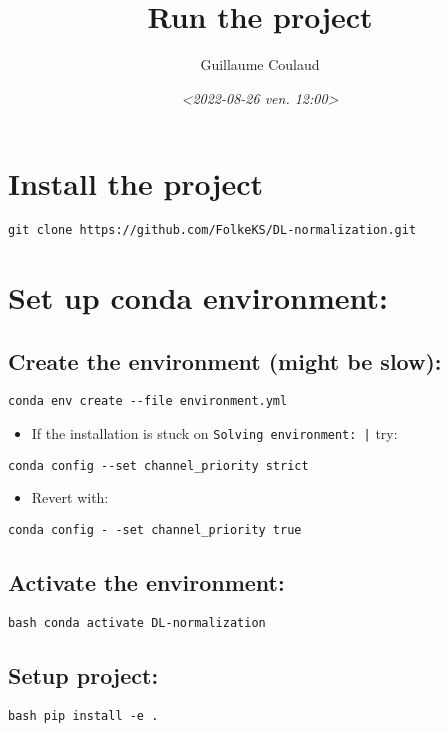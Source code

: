 \documentclass[11pt]{article}
\author{Guillaume Coulaud}
\date{\textit{<2022-08-26 ven. 12:00>}}
\title{Run the project}
\begin{document}
\maketitle
\tableofcontents

\section{Install the project}
\label{sec:orge89ff4f}
\begin{verbatim}
git clone https://github.com/FolkeKS/DL-normalization.git
\end{verbatim}

\section{Set up conda environment:}
\label{sec:org866e4e1}

\subsection{Create the environment (might be slow):}
\label{sec:orgec1dbc1}
\begin{verbatim}
conda env create --file environment.yml
\end{verbatim}
\begin{itemize}
\item If the installation is stuck on \texttt{Solving environment: |} try:
\end{itemize}
\begin{verbatim}
conda config --set channel_priority strict
\end{verbatim}
\begin{itemize}
\item Revert with:
\end{itemize}
\begin{verbatim}
conda config - -set channel_priority true
\end{verbatim}
\subsection{Activate the environment:}
\label{sec:orge97e7f7}
\begin{verbatim}
bash conda activate DL-normalization
\end{verbatim}
\subsection{Setup project:}
\label{sec:org504a9da}
\begin{verbatim}
bash pip install -e .
\end{verbatim}
\end{document}
